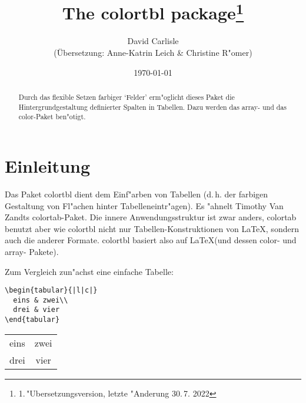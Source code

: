 \documentclass[ngerman]{article}
\begin{document}
\def\slash#1{\textbackslash#1}

 \title{The \textsf{colortbl} package\footnote{1.\,"Ubersetzungsversion,
 letzte "Anderung 30.\,7. 2022}}

 \author{{\huge David Carlisle}\\ (\"Ubersetzung: Anne-Katrin Leich \& Christine
 R"omer)}

\date{\today}

\maketitle

\begin{abstract}
Durch das flexible Setzen farbiger `Felder' erm"oglicht dieses Paket die 
Hintergrundgestaltung definierter Spalten in Tabellen. Dazu werden das \textsf{array}- und 
das \textsf{color}-Paket ben"otigt.
\end{abstract}

\section{Einleitung}

Das Paket \textsf{colortbl} dient dem Einf"arben von Tabellen (d.\,h. der farbigen 
Gestaltung von 
Fl"achen hinter Tabelleneintr"agen). Es "ahnelt Timothy Van Zandts \textsf{colortab}-Paket. 
Die innere Anwendungsstruktur ist zwar anders, \textsf{colortab} benutzt aber wie 
\textsf{colortbl} nicht nur Tabellen-Konstruktionen von \LaTeX, sondern auch die anderer 
Formate. \textsf{colortbl} basiert also auf \LaTeX (und dessen \textsf{color}- und 
\textsf{array}- Pakete).

	Zum Vergleich zun"achst eine einfache Tabelle:

\begin{center}
\begin{minipage}{.75\textwidth}
\begin{verbatim}
\begin{tabular}{|l|c|}
  eins & zwei\\
  drei & vier
\end{tabular}
\end{verbatim}
\end{minipage}
{\bfseries
  \begin{tabular}{|l|c|}
  eins&zwei\\
  drei&vier
  \end{tabular}}
 \end{center}
\end{document}
